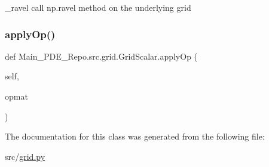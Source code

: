 \+\_\+ravel call np.\+ravel method on the underlying grid 

\mbox{\label{classMain__PDE__Repo_1_1src_1_1grid_1_1GridScalar_afbf5e11df0a675137c8bd157552f76e7}} 
\subsubsection{\texorpdfstring{apply\+Op()}{applyOp()}}
{\footnotesize\ttfamily def Main\+\_\+\+P\+D\+E\+\_\+\+Repo.\+src.\+grid.\+Grid\+Scalar.\+apply\+Op (\begin{DoxyParamCaption}\item[{}]{self,  }\item[{}]{opmat }\end{DoxyParamCaption})}



The documentation for this class was generated from the following file\+:\begin{DoxyCompactItemize}
\item 
src/\hyperlink{grid_8py}{grid.\+py}\end{DoxyCompactItemize}
